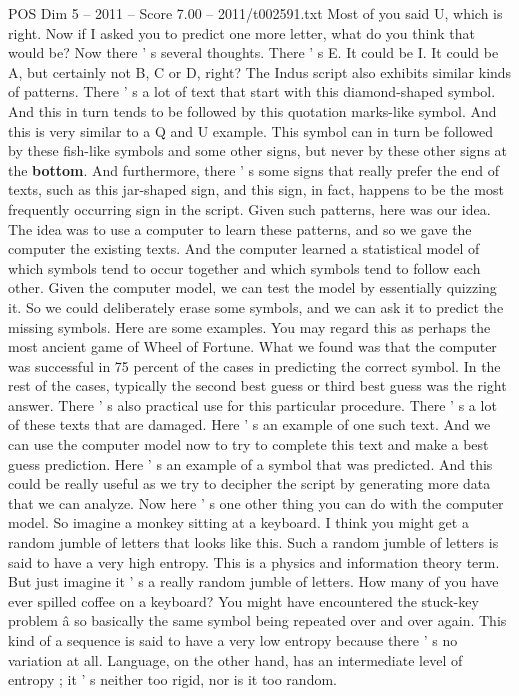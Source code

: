 \begin{textsample}{POS Dim 5 – 2011 – Score 7.00 – 2011/t002591.txt}
Most of you said U, which is right.
Now if I asked you to predict one more letter, what do you think that would be?
Now there ' s several thoughts.
There ' s E.
It could be I.
It could be A, but certainly not B, C or D, right?
The Indus script also exhibits similar kinds of patterns.
There ' s a lot of text that start with this diamond-shaped symbol.
And this in turn tends to be followed by this quotation marks-like symbol.
And this is very similar to a Q and U example.
This symbol can in turn be followed by these fish-like symbols and some other signs, but never by these other signs at the \textbf{bottom}.
And furthermore, there ' s some signs that really prefer the end of texts, such as this jar-shaped sign, and this sign, in fact, happens to be the most frequently occurring sign in the script.
Given such patterns, here was our idea.
The idea was to use a computer to learn these patterns, and so we gave the computer the existing texts.
And the computer learned a statistical model of which symbols tend to occur together and which symbols tend to follow each other.
Given the computer model, we can test the model by essentially quizzing it.
So we could deliberately erase some symbols, and we can ask it to predict the missing symbols.
Here are some examples.
You may regard this as perhaps the most ancient game of Wheel of Fortune.
What we found was that the computer was successful in 75 percent of the cases in predicting the correct symbol.
In the rest of the cases, typically the second best guess or third best guess was the right answer.
There ' s also practical use for this particular procedure.
There ' s a lot of these texts that are damaged.
Here ' s an example of one such text.
And we can use the computer model now to try to complete this text and make a best guess prediction.
Here ' s an example of a symbol that was predicted.
And this could be really useful as we try to decipher the script by generating more data that we can analyze.
Now here ' s one other thing you can do with the computer model.
So imagine a monkey sitting at a keyboard.
I think you might get a random jumble of letters that looks like this.
Such a random jumble of letters is said to have a very high entropy.
This is a physics and information theory term.
But just imagine it ' s a really random jumble of letters.
How many of you have ever spilled coffee on a keyboard?
You might have encountered the stuck-key problem â so basically the same symbol being repeated over and over again.
This kind of a sequence is said to have a very low entropy because there ' s no variation at all.
Language, on the other hand, has an intermediate level of entropy ; it ' s neither too rigid, nor is it too random.

\end{textsample}
